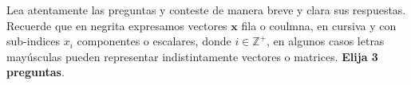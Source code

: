 \documentclass{exam}
\theoremstyle{definition}
\begin{document}
\thispagestyle{empty}
Lea atentamente las preguntas y conteste de manera breve y clara sus respuestas. Recuerde que en negrita expresamos vectores $\mathbf{x}$ fila o coulmna, en cursiva y con sub-indices $x_i$ componentes o escalares, donde $i\in \mathbb{Z}^{+}$, en algunos casos letras mayúsculas pueden representar indistintamente vectores o matrices. \textbf{Elija 3 preguntas}.
\end{document}
